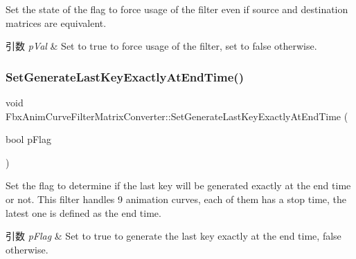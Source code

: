 Set the state of the flag to force usage of the filter even if source and destination matrices are equivalent. 
\begin{DoxyParams}{引数}
{\em p\+Val} & Set to {\ttfamily true} to force usage of the filter, set to {\ttfamily false} otherwise. \\
\hline
\end{DoxyParams}
\mbox{\label{class_fbx_anim_curve_filter_matrix_converter_a3f6bbf821eff2180bef5b63764d4a305}} 
\subsubsection{\texorpdfstring{Set\+Generate\+Last\+Key\+Exactly\+At\+End\+Time()}{SetGenerateLastKeyExactlyAtEndTime()}}
{\footnotesize\ttfamily void Fbx\+Anim\+Curve\+Filter\+Matrix\+Converter\+::\+Set\+Generate\+Last\+Key\+Exactly\+At\+End\+Time (\begin{DoxyParamCaption}\item[{bool}]{p\+Flag }\end{DoxyParamCaption})}

Set the flag to determine if the last key will be generated exactly at the end time or not. This filter handles 9 animation curves, each of them has a stop time, the latest one is defined as the end time. 
\begin{DoxyParams}{引数}
{\em p\+Flag} & Set to {\ttfamily true} to generate the last key exactly at the end time, {\ttfamily false} otherwise. \\
\hline
\end{DoxyParams}
\mbox{\label{class_fbx_anim_curve_filter_matrix_converter_a3ce7c2108f6a39ad4a13cbc4175a5ec8}} 
